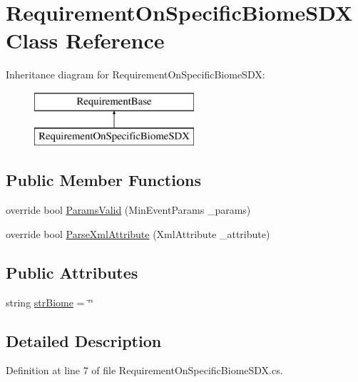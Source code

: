 \hypertarget{class_requirement_on_specific_biome_s_d_x}{}\section{Requirement\+On\+Specific\+Biome\+S\+DX Class Reference}
\label{class_requirement_on_specific_biome_s_d_x}
Inheritance diagram for Requirement\+On\+Specific\+Biome\+S\+DX\+:\begin{figure}[H]
\begin{center}
\leavevmode
\includegraphics[height=2.000000cm]{dc/d2c/class_requirement_on_specific_biome_s_d_x}
\end{center}
\end{figure}
\subsection*{Public Member Functions}
\begin{DoxyCompactItemize}
\item 
override bool \mbox{\hyperlink{class_requirement_on_specific_biome_s_d_x_aacda5204187f23ca80df26561e3c6f40}{Params\+Valid}} (Min\+Event\+Params \+\_\+params)
\item 
override bool \mbox{\hyperlink{class_requirement_on_specific_biome_s_d_x_a2bfc37359c11f9108f2a3e9c4be34727}{Parse\+Xml\+Attribute}} (Xml\+Attribute \+\_\+attribute)
\end{DoxyCompactItemize}
\subsection*{Public Attributes}
\begin{DoxyCompactItemize}
\item 
string \mbox{\hyperlink{class_requirement_on_specific_biome_s_d_x_aa3d98e5bf06732fa8a5be22a27da898a}{str\+Biome}} = \char`\"{}\char`\"{}
\end{DoxyCompactItemize}


\subsection{Detailed Description}


Definition at line 7 of file Requirement\+On\+Specific\+Biome\+S\+D\+X.\+cs.



